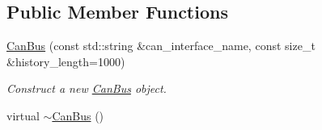 \subsection*{Public Member Functions}
\begin{DoxyCompactItemize}
\item 
\hyperlink{classblmc__drivers_1_1CanBus_a7d376f1ebd6dd8bc3299f6fc9f3d42c6}{Can\+Bus} (const std\+::string \&can\+\_\+interface\+\_\+name, const size\+\_\+t \&history\+\_\+length=1000)
\begin{DoxyCompactList}\small\item\em Construct a new \hyperlink{classblmc__drivers_1_1CanBus}{Can\+Bus} object. \end{DoxyCompactList}\item 
virtual \hyperlink{classblmc__drivers_1_1CanBus_aa79afdda8d7f28ea63d32bf1a5a0f196}{$\sim$\+Can\+Bus} ()\hypertarget{classblmc__drivers_1_1CanBus_aa79afdda8d7f28ea63d32bf1a5a0f196}{}\label{classblmc__drivers_1_1CanBus_aa79afdda8d7f28ea63d32bf1a5a0f196}


\end{DoxyCompactItemize}
